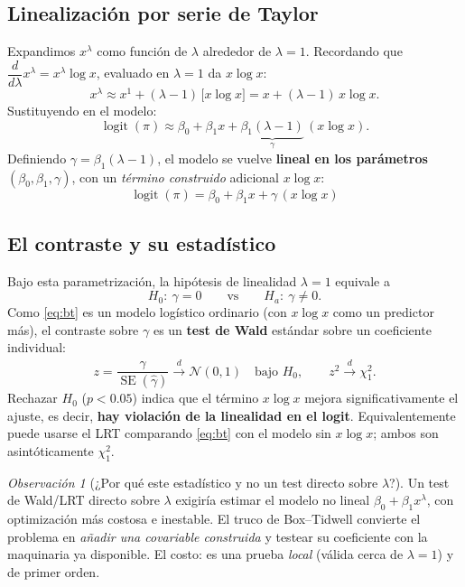 \documentclass[11pt]{article}
\theoremstyle{plain}
\theoremstyle{definition}
\theoremstyle{remark}
\newtheorem{observacion}[teorema]{Observación}
\newcommand{\logit}{\operatorname{logit}}
\newcommand{\convd}{\xrightarrow{d}}
\newcommand{\Nor}{\mathcal{N}}
\begin{document}
\subsection{Linealización por serie de Taylor}

Expandimos $x^\lambda$ como función de $\lambda$ alrededor de $\lambda=1$.
Recordando que $\dfrac{d}{d\lambda}x^\lambda = x^\lambda\log x$, evaluado en
$\lambda=1$ da $x\log x$:
\[
  x^\lambda \approx x^1 + (\lambda-1)\,\big[x\log x\big]
  = x + (\lambda-1)\,x\log x.
\]
Sustituyendo en el modelo:
\[
  \logit(\pi) \approx \beta_0 + \beta_1 x
  + \underbrace{\beta_1(\lambda-1)}_{\displaystyle \gamma}\, (x\log x).
\]
Definiendo $\gamma = \beta_1(\lambda-1)$, el modelo se vuelve \textbf{lineal en
los parámetros} $(\beta_0,\beta_1,\gamma)$, con un \emph{término construido}
adicional $x\log x$:
\begin{equation}
  \boxed{\;\logit(\pi) = \beta_0 + \beta_1 x + \gamma\,(x\log x)\;}
  \label{eq:bt}
\end{equation}

\subsection{El contraste y su estadístico}

Bajo esta parametrización, la hipótesis de linealidad $\lambda=1$ equivale a
\[
  H_0:\ \gamma = 0 \qquad\text{vs}\qquad H_a:\ \gamma\neq 0.
\]
Como \eqref{eq:bt} es un modelo logístico ordinario (con $x\log x$ como un
predictor más), el contraste sobre $\gamma$ es un \textbf{test de Wald} estándar
sobre un coeficiente individual:
\[
  z = \frac{\hat\gamma}{\operatorname{SE}(\hat\gamma)} \convd \Nor(0,1)
  \quad\text{bajo }H_0,
  \qquad z^2\convd\chi^2_1.
\]
Rechazar $H_0$ ($p<0.05$) indica que el término $x\log x$ mejora
significativamente el ajuste, es decir, \textbf{hay violación de la linealidad
en el logit}. Equivalentemente puede usarse el LRT comparando \eqref{eq:bt} con
el modelo sin $x\log x$; ambos son asintóticamente $\chi^2_1$.

\begin{observacion}[¿Por qué este estadístico y no un test directo sobre
$\lambda$?]
Un test de Wald/LRT directo sobre $\lambda$ exigiría estimar el modelo no lineal
$\beta_0+\beta_1 x^\lambda$, con optimización más costosa e inestable. El truco
de Box--Tidwell convierte el problema en \emph{añadir una covariable
construida} y testear su coeficiente con la maquinaria ya disponible. El costo:
es una prueba \emph{local} (válida cerca de $\lambda=1$) y de primer orden.
\end{observacion}
\end{document}
